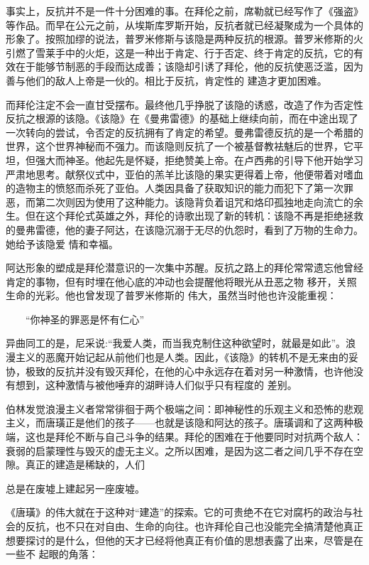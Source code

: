 \documentclass{article}
\begin{document}
事实上，反抗并不是一件十分困难的事。在拜伦之前，席勒就已经写作了《强盗》等作品。而早在公元之前，从埃斯库罗斯开始，反抗者就已经凝聚成为一个具体的形象了。按照加缪的说法，普罗米修斯与该隐是两种反抗的根源。普罗米修斯的火引燃了雪莱手中的火炬，这是一种出于肯定、行于否定、终于肯定的反抗，它的有效在于能够节制恶的手段而达成善；该隐却引诱了拜伦，他的反抗使恶泛滥，因为善与他们的敌人上帝是一伙的。相比于反抗，肯定性的
建造才更加困难。 

\newpage

而拜伦注定不会一直甘受摆布。最终他几乎挣脱了该隐的诱惑，改造了作为否定性反抗之根源的该隐。《该隐》在《曼弗雷德》的基础上继续向前，而在中途出现了一次转向的尝试，令否定的反抗拥有了肯定的希望。曼弗雷德反抗的是一个希腊的世界，这个世界神秘而不强力。而该隐则反抗了一个被基督教袪魅后的世界，它平坦，但强大而神圣。他起先是怀疑，拒绝赞美上帝。在卢西弗的引导下他开始学习严肃地思考。献祭仪式中，亚伯的羔羊比该隐的果实更得着上帝，他便带着对嗜血的造物主的愤怒而杀死了亚伯。人类因具备了获取知识的能力而犯下了第一次罪恶，而第二次则因为使用了这种能力。该隐背负着诅咒和烙印孤独地走向流亡的余生。但在这个拜伦式英雄之外，拜伦的诗歌出现了新的转机：该隐不再是拒绝拯救的曼弗雷德，他的妻子阿达，在该隐沉溺于无尽的仇怨时，看到了万物的生命力。她给予该隐爱
情和幸福。 

阿达形象的塑成是拜伦潜意识的一次集中苏醒。反抗之路上的拜伦常常遗忘他曾经肯定的事物，但有时埋在他心底的冲动也会提醒他将眼光从丑恶之物
\newpage
移开，关照生命的光彩。他也曾发现了普罗米修斯的
伟大，虽然当时他也许没能重视： 


　　“你神圣的罪恶是怀有仁心” 

异曲同工的是，尼采说:“我爱人类，而当我克制住这种欲望时，就最是如此”。浪漫主义的恶魔开始记起从前他们也是人类。因此，《该隐》的转机不是无来由的妥协，极致的反抗并没有毁灭拜伦，在他的心中永远存在着对另一种激情，也许他没有想到，这种激情与被他唾弃的湖畔诗人们似乎只有程度的
差别。 

伯林发觉浪漫主义者常常徘徊于两个极端之间：即神秘性的乐观主义和恐怖的悲观主义，而唐璜正是他们的孩子——也就是该隐和阿达的孩子。唐璜调和了这两种极端，这也是拜伦不断与自己斗争的结果。拜伦的困难在于他要同时对抗两个敌人：衰弱的启蒙理性与毁灭的虚无主义。之所以困难，是因为这二者之间几乎不存在空隙。真正的建造是稀缺的，人们

\newpage
总是在废墟上建起另一座废墟。 

《唐璜》的伟大就在于这种对“建造”的探索。它的可贵绝不在它对腐朽的政治与社会的反抗，也不只在对自由、生命的向往。也许拜伦自己也没能完全搞清楚他真正想要探讨的是什么，但他的天才已经将他真正有价值的思想表露了出来，尽管是在一些不
起眼的角落： 
\end{document}
